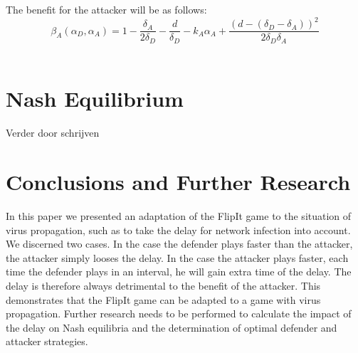 \documentclass[master=cws, masteroption=vs]{kulemt}
\begin{document}
\begin{abstract*}
The benefit for the attacker will be as follows:
\begin{equation}\label{first}
\beta_{A}(\alpha_{D},\alpha_{A}) = 1 -\dfrac{\delta_{A}}{2\delta_{D}} - \dfrac{d}{\delta_{D}} - k_{A} \alpha_{A} + \dfrac{(d - (\delta_{D} - \delta_{A}))^{2}}{2 \delta_{D} \delta_{A}}
\end{equation}\\


\section{Nash Equilibrium}
Verder door schrijven

\section{Conclusions and Further Research}
\label{ch:conclusion}
In this paper we presented an adaptation of the FlipIt game to the situation of virus propagation, such as to take the delay for network infection into account. We discerned two cases. In the case the defender plays faster than the attacker, the attacker simply looses the delay. In the case the attacker plays faster, each time the defender plays in an interval, he will gain extra time of the delay. The delay is therefore always detrimental to the benefit of the attacker. 
This demonstrates that the FlipIt game can be adapted to a game with virus propagation. Further research needs to be performed to calculate the impact of the delay on Nash equilibria and the determination of optimal defender and attacker strategies.
%  
\end{abstract*}
\end{document}
